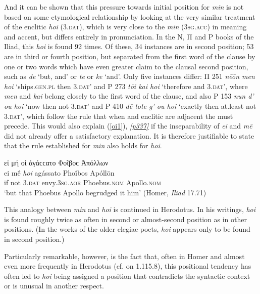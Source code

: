 And it can be shown that this pressure towards initial position for \emph{min} is not based on some etymological relationship by looking at the very similar treatment of the enclitic  \emph{hoi} (\textsc{3.dat}), which is very close to the  \emph{min} (\textsc{3sg.acc}) in meaning and accent, but differs entirely in pronunciation. In the Ν, Π and Ρ books of the Iliad, this \emph{hoi} is found 92 times. Of these, 34 instances are in second position; 53 are in third or fourth position, but separated from the first word of the clause by one or two words which have even greater claim to the clausal second position, such as \emph{de} `but, and' or \emph{te} or \emph{ke} `and'. Only five instances differ: Π 251 \emph{nēōn men hoi} `ships.\textsc{gen.pl} then \textsc{3.dat}' and Ρ 273 \emph{tōi kai hoi} `therefore and \textsc{3.dat}', where \emph{men} and \emph{kai} belong closely to the first word of the clause, and also Ρ 153 \emph{nun d' ou hoi} `now then not \textsc{3.dat}' and Ρ 410 \emph{dē tote g' ou hoi} `exactly then at.least not \textsc{3.dat}', which follow the rule that when  and enclitic are adjacent the  must precede.\label{ouk2} This would also explain (\ref{oi1}), \hyperlink{p337}{\emph{[p337]}} if the inseparability of \emph{ei} and \emph{mē} did not already offer a satisfactory explanation. It is therefore justifiable to state that the rule established for \emph{min} also holds for \emph{hoi}.

\begin{exe}
\ex εἰ μή οἱ ἀγάϲϲατο Φοῖβοϲ Ἀπόλλων\\
\gll ei mḗ \emph{hoi} agássato Phoîbos Apóllōn\\
if not \textsc{3.dat} envy.\textsc{3sg.aor} Phoebus.\textsc{nom} Apollo.\textsc{nom}\\
\trans `but that Phoebus Apollo begrudged it him' (Homer, \emph{Iliad} 17.71)
\label{oi1}
\end{exe}

This analogy between \emph{min} and \emph{hoi} is continued in Herodotus. In his writings, \emph{hoi} is found roughly twice as often in second or almost-second position as in other positions. (In the works of the older elegiac poets, \emph{hoi} appears only to be found in second position.)

Particularly remarkable, however, is the fact that, often in Homer and almost even more frequently in Herodotus (cf. \citealp[138]{Stein1883} on 1.115.8), this positional tendency has often led to \emph{hoi} being assigned a position that contradicts the syntactic context or is unusual in another respect.\label{oi}

